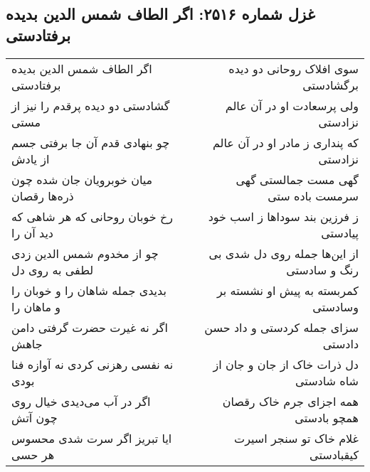 \begin{center}
\section*{غزل شماره ۲۵۱۶: اگر الطاف شمس الدین بدیده برفتادستی}
\label{sec:2516}
\begin{longtable}{l p{0.5cm} r}
اگر الطاف شمس الدین بدیده برفتادستی
&&
سوی افلاک روحانی دو دیده برگشادستی
\\
گشادستی دو دیده پرقدم را نیز از مستی
&&
ولی پرسعادت او در آن عالم نزادستی
\\
چو بنهادی قدم آن جا برفتی جسم از یادش
&&
که پنداری ز مادر او در آن عالم نزادستی
\\
میان خوبرویان جان شده چون ذره‌ها رقصان
&&
گهی مست جمالستی گهی سرمست باده ستی
\\
رخ خوبان روحانی که هر شاهی که دید آن را
&&
ز فرزین بند سوداها ز اسب خود پیادستی
\\
چو از مخدوم شمس الدین زدی لطفی به روی دل
&&
از این‌ها جمله روی دل شدی بی رنگ و سادستی
\\
بدیدی جمله شاهان را و خوبان را و ماهان را
&&
کمربسته به پیش او نشسته بر وسادستی
\\
اگر نه غیرت حضرت گرفتی دامن جاهش
&&
سزای جمله کردستی و داد حسن دادستی
\\
نه نفسی رهزنی کردی نه آوازه فنا بودی
&&
دل ذرات خاک از جان و جان از شاه شادستی
\\
اگر در آب می‌دیدی خیال روی چون آتش
&&
همه اجزای جرم خاک رقصان همچو بادستی
\\
ایا تبریز اگر سرت شدی محسوس هر حسی
&&
غلام خاک تو سنجر اسیرت کیقبادستی
\\
\end{longtable}
\end{center}
